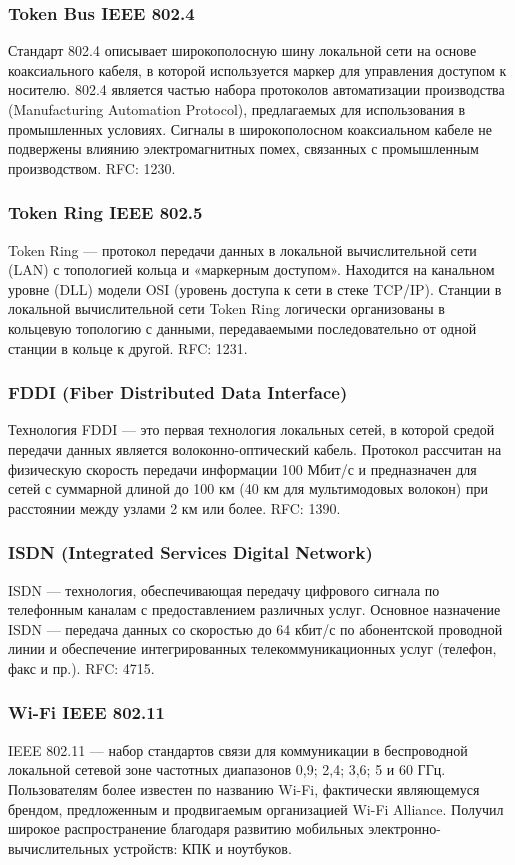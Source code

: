 \subsubsection{Token Bus IEEE 802.4}
Стандарт 802.4 описывает широкополосную шину локальной сети на основе коаксиального
кабеля, в которой используется маркер для управления доступом к носителю. 802.4 является
частью набора протоколов автоматизации производства (Manufacturing Automation Protocol),
предлагаемых для использования в промышленных условиях. Сигналы в широкополосном
коаксиальном кабеле не подвержены влиянию электромагнитных помех, связанных с
промышленным производством. RFC: 1230. 

\subsubsection{Token Ring IEEE 802.5}
Token Ring — протокол передачи данных в локальной вычислительной сети (LAN) с
топологией кольца и «маркерным доступом». Находится на канальном уровне (DLL) модели
OSI (уровень доступа к сети в стеке TCP/IP). Станции в локальной вычислительной сети Token
Ring логически организованы в кольцевую топологию с данными, передаваемыми
последовательно от одной станции в кольце к другой. RFC: 1231.

\subsubsection{FDDI (Fiber Distributed Data Interface)}
Технология FDDI — это первая технология локальных сетей, в которой средой передачи
данных является волоконно-оптический кабель. Протокол рассчитан на физическую скорость
передачи информации 100 Мбит/с и предназначен для сетей с суммарной длиной до 100 км (40
км для мультимодовых волокон) при расстоянии между узлами 2 км или более. RFC: 1390.

\subsubsection{ISDN (Integrated Services Digital Network)}
ISDN — технология, обеспечивающая передачу цифрового сигнала по телефонным каналам
с предоставлением различных услуг. Основное назначение ISDN — передача данных со
скоростью до 64 кбит/с по абонентской проводной линии и обеспечение интегрированных
телекоммуникационных услуг (телефон, факс и пр.). RFC: 4715.

\subsubsection{Wi-Fi IEEE 802.11}
IEEE 802.11 — набор стандартов связи для коммуникации в беспроводной локальной
сетевой зоне частотных диапазонов 0,9; 2,4; 3,6; 5 и 60 ГГц. Пользователям более известен по
названию Wi-Fi, фактически являющемуся брендом, предложенным и продвигаемым
организацией Wi-Fi Alliance. Получил широкое распространение благодаря развитию
мобильных электронно-вычислительных устройств: КПК и ноутбуков.

